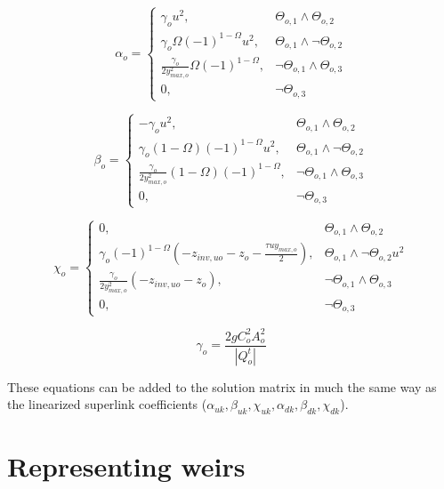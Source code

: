 \documentclass[11pt]{article}
\begin{document}
\begin{equation}
  \alpha_{o} =
  \begin{cases}
   \gamma_o u^2, & \Theta_{o,1} \land \Theta_{o,2}\\
   \gamma_o \Omega (-1)^{1 - \Omega} u^2, & \Theta_{o,1} \land \lnot \Theta_{o,2}\\
   \frac{\gamma_o}{2 y_{max,o}^2} \Omega (-1)^{1 - \Omega}, & \lnot \Theta_{o,1} \land \Theta_{o,3} \\
   0, & \lnot \Theta_{o,3}
  \end{cases}
\end{equation}

\begin{equation}
  \beta_{o} =
  \begin{cases}
   -\gamma_o u^2, & \Theta_{o,1} \land \Theta_{o,2}\\
   \gamma_o (1 - \Omega) (-1)^{1 - \Omega} u^2, & \Theta_{o,1} \land \lnot \Theta_{o,2}\\
   \frac{\gamma_o}{2 y_{max,o}^2} (1 - \Omega) (-1)^{1 - \Omega}, & \lnot \Theta_{o,1} \land \Theta_{o,3} \\
   0, & \lnot \Theta_{o,3}
  \end{cases}
\end{equation}

\begin{equation}
  \chi_{o} =
  \begin{cases}
   0, & \Theta_{o,1} \land \Theta_{o,2}\\
   \gamma_o (-1)^{1 - \Omega} (- z_{inv,uo} - z_o - \frac{\tau u y_{max,o}}{2}), & \Theta_{o,1} \land \lnot \Theta_{o,2} u^2\\
   \frac{\gamma_o}{2 y_{max,o}^2} (- z_{inv,uo} - z_o), & \lnot \Theta_{o,1} \land \Theta_{o,3} \\
   0, & \lnot \Theta_{o,3}
  \end{cases}
\end{equation}

\begin{equation}
 \gamma_o = \frac{2 g C_o^2 A_o^2}{|Q_o^t|} 
\end{equation}

These equations can be added to the solution matrix in much the same way as the
linearized superlink coefficients ($\alpha_{uk}, \beta_{uk}, \chi_{uk},
\alpha_{dk}, \beta_{dk}, \chi_{dk}$).

\section*{Representing weirs}
\end{document}
